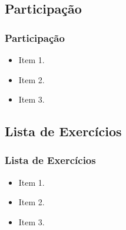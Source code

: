\subsection[Participação]{Participação}\label{subsec:planejamento-participacao}



\begin{frame}[t]\frametitle{Participação}

  \begin{itemize}
    \justifying{}
    \setlength\itemsep{1em}
    \item Item 1.
    \item Item 2.
    \item Item 3.
  \end{itemize}

\end{frame}



\subsection[Lista de Exercícios]{Lista de Exercícios}\label{subsec:planejamento-lista-exercicios}



\begin{frame}[t]\frametitle{Lista de Exercícios}

  \begin{itemize}
    \justifying{}
    \setlength\itemsep{1em}
    \item Item 1.
    \item Item 2.
    \item Item 3.
  \end{itemize}

\end{frame}



